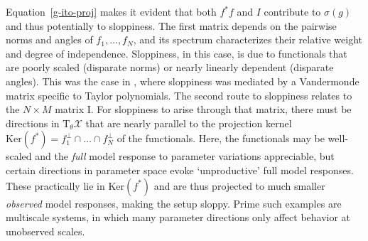 \documentclass{article}
\newcommand{\p}{\theta}
\newcommand{\fmm}{\mathcal{X}}
\begin{document}
Equation~\eqref{g-ito-proj} makes it evident that both $f^* f$ and $I$ contribute to $\sigma(g)$ and thus potentially to sloppiness.
The first matrix depends on the pairwise norms and angles of $f_1,\ldots,f_N$, and its spectrum characterizes their relative weight and degree of independence.
Sloppiness, in this case, is due to functionals that are poorly scaled (disparate norms) or nearly linearly dependent (disparate angles).
This was the case in \cite{WCGBMBES06}, where sloppiness was mediated by a Vandermonde matrix specific to Taylor polynomials.
The second route to sloppiness relates to the $N \times M$ matrix $\mathrm{I}$.
For sloppiness to arise through that matrix, there must be directions in $\mathrm{T}_\p\fmm$ that are nearly parallel to the projection kernel $\mathrm{Ker}(f^*) = f_1^\perp \cap \ldots \cap f_N^\perp$ of the functionals.
Here, the functionals may be well-scaled and the \emph{full} model response to parameter variations appreciable, but certain directions in parameter space evoke `unproductive' full model responses.
These practically lie in $\mathrm{Ker}(f^*)$ and are thus projected to much smaller \emph{observed} model responses, making the setup sloppy.
Prime such examples are multiscale systems, in which many parameter directions only affect behavior at unobserved scales.\\
\end{document}
